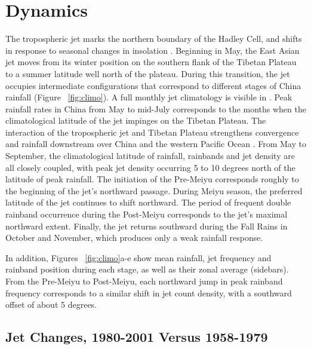 \section{Dynamics}

	The tropospheric jet marks the northern boundary of the Hadley Cell, and shifts in response to seasonal changes in insolation \citep{Bordoni2008}. Beginning in May, the East Asian jet moves from its winter position on the southern flank of the Tibetan Plateau to a summer latitude well north of the plateau. During this transition, the jet occupies intermediate configurations that correspond to different stages of China rainfall (Figure ~\ref{fig:climo}). A full monthly jet climatology is visible in \citet{Schiemann2009}. Peak rainfall rates in China from May to mid-July corresponds to the months when the climatological latitude of the jet impinges on the Tibetan Plateau. The interaction of the tropospheric jet and Tibetan Plateau strengthens convergence and rainfall downstream over China and the western Pacific Ocean \citep{Molnar2010,Sampe2010,Chen2014}. From May to September,  the climatological latitude of rainfall, rainbands and jet density are all closely coupled, with peak jet density occurring 5 to 10 degrees north of the latitude of peak rainfall. The initiation of the Pre-Meiyu corresponds roughly to the beginning of the jet's northward passage. During Meiyu season, the preferred latitude of the jet continues to shift northward. The period of frequent double rainband occurrence during the Post-Meiyu corresponds to the jet's maximal northward extent. Finally, the jet returns southward during the Fall Rains in October and November, which produces only a weak rainfall response.
	
	In addition, Figures ~\ref{fig:climo}a-e show mean rainfall, jet frequency and rainband position during each stage, as well as their zonal average (sidebars). From the Pre-Meiyu to Post-Meiyu, each northward jump in peak rainband frequency corresponds to a similar shift in jet count density, with a southward offset of about 5 degrees.
	
\subsection{Jet Changes, 1980-2001 Versus 1958-1979}

